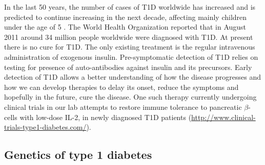 In the last 50 years, the number of cases of T1D worldwide has increased and is predicted to continue increasing in the next decade,
affecting mainly children under the age of 5 \citep{Patterson:2009gj}.
The World Health Organization reported that in August 2011 around 34 million people worldwide were diagnosed with T1D.
At present there is no cure for \gls{T1D}.
The only existing treatment is the regular intravenous administration of exogenous insulin.  
Pre-symptomatic detection of T1D relies on testing for presence of auto-antibodies against insulin and its precursors.
Early detection of T1D allows a better understanding of how the disease progresses and how we can develop therapies to delay its onset,
reduce the symptoms and hopefully in the future, cure the disease.  
One such therapy currently undergoing clinical trials in our lab attempts to restore immune tolerance to pancreatic $\beta$-cells with low-dose \gls{IL-2},
in newly diagnosed \gls{T1D} patients (\url{http://www.clinical-trials-type1-diabetes.com/}).


\subsection{Genetics of type 1 diabetes}


